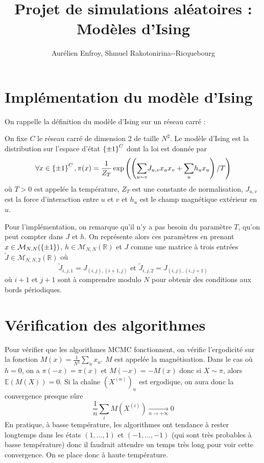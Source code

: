 \documentclass[a4paper,11pt]{article}
\title{Projet de simulations aléatoires : Modèles d'Ising}
\author{Aurélien Enfroy, Shmuel Rakotonirina{-}-Ricquebourg}
\begin{document}
\maketitle

\section{Implémentation du modèle d'Ising}

On rappelle la définition du modèle d'Ising sur un réseau carré :
\begin{definition}
On fixe $C$ le réseau carré de dimension 2 de taille $N^2$. Le modèle d'Ising est la distribution sur l'espace d'état $\left\lbrace \pm 1 \right\rbrace^C$ dont la loi est donnée par
$$\forall x \in \left\lbrace \pm 1 \right\rbrace^C, \pi(x) = \frac{1}{Z_T} \exp \left(\left( \displaystyle{\sum_{u\sim v}^{}} J_{u,v} x_{u} x_{v} + \displaystyle{\sum_{u}^{}} h_{u} x_{u} \right)/T\right)$$
où $T>0$ est appelée la température, $Z_T$ est une constante de normalisation, $J_{u,v}$ est la force d'interaction entre $u$ et $v$ et $h_{u}$ est le champ magnétique extérieur en $u$.
\end{definition}

Pour l'implémentation, on remarque qu'il n'y a pas besoin du paramètre $T$, qu'on peut compter dans $J$ et $h$. On représente alors ces paramètres en prenant $x \in \mathcal M_{N,N}(\left\lbrace \pm 1 \right\rbrace)$, $h \in \mathcal M_{N,N}(\mathbb R)$ et $J$ comme une matrice à trois entrées $\tilde J \in \mathcal M_{N,N,2}(\mathbb R)$ où
$$\tilde J_{i,j,1} = J_{(i,j),(i+1,j)} \text{ et } \tilde J_{i,j,2} = J_{(i,j),(i,j+1)}$$
où $i+1$ et $j+1$ sont à comprendre modulo $N$ pour obtenir des conditions aux bords périodiques.

\section{Vérification des algorithmes}

Pour vérifier que les algorithmes MCMC fonctionnent, on vérifie l'ergodicité sur la fonction $M(x) = \frac{1}{N^2} \sum_u x_u$. $M$ est appelée la magnétisation. Dans le cas où $h = 0$, on a $\pi(-x) = \pi(x)$ et $M(-x) = -M(x)$ donc si $X \sim \pi$, alors $\mathbb E(M(X)) = 0$. Si la chaîne $(X^{(n)})_n$ est ergodique, on aura donc la convergence presque sûre
$$\frac{1}{n} \sum_i M(X^{(i)}) \xrightarrow[n \rightarrow +\infty]{} 0$$
En pratique, à basse température, les algorithmes ont tendance à rester longtemps dans les états $(1,\hdots,1)$ et $(-1,\hdots,-1)$ (qui sont très probables à basse température) donc il faudrait attendre un temps très long pour voir cette convergence. On se place donc à haute température.
\end{document}
